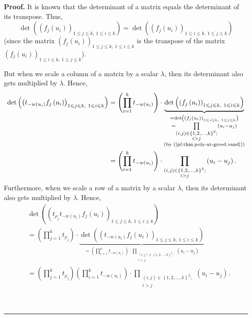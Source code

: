 \documentclass[numbers=enddot,12pt,final,onecolumn,notitlepage]{scrartcl}%
\theoremstyle{definition}
\newenvironment{proof}[1][Proof]{\noindent\textbf{#1.} }{\ \rule{0.5em}{0.5em}}
\let\prodnonlimits\prod
\renewcommand{\prod}{\prodnonlimits\limits}
\renewcommand{\leq}{\leqslant}
\theoremstyle{plainsl}
\begin{document}
\begin{proof}
It is known that the determinant of a matrix equals the determinant of its
transpose. Thus,%
\[
\det\left(  \left(  f_{j}\left(  u_{i}\right)  \right)  _{1\leq j\leq
k,\ 1\leq i\leq k}\right)  =\det\left(  \left(  f_{j}\left(  u_{i}\right)
\right)  _{1\leq i\leq k,\ 1\leq j\leq k}\right)
\]
(since the matrix $\left(  f_{j}\left(  u_{i}\right)  \right)  _{1\leq j\leq
k,\ 1\leq i\leq k}$ is the transpose of the matrix $\left(  f_{j}\left(
u_{i}\right)  \right)  _{1\leq i\leq k,\ 1\leq j\leq k}$).

But when we scale a column of a matrix by a scalar $\lambda$, then its
determinant also gets multiplied by $\lambda$. Hence,%
\begin{align*}
\det\left(  \left(  t_{-w\left(  u_{i}\right)  }f_{j}\left(  u_{i}\right)
\right)  _{1\leq j\leq k,\ 1\leq i\leq k}\right)   &  =\left(  \prod_{i=1}%
^{k}t_{-w\left(  u_{i}\right)  }\right)  \cdot\underbrace{\det\left(  \left(
f_{j}\left(  u_{i}\right)  \right)  _{1\leq j\leq k,\ 1\leq i\leq k}\right)
}_{\substack{=\det\left(  \left(  f_{j}\left(  u_{i}\right)  \right)  _{1\leq
i\leq k,\ 1\leq j\leq k}\right)  \\=\prod_{\substack{\left(  i,j\right)
\in\left\{  1,2,\ldots,k\right\}  ^{2};\\i>j}}\left(  u_{i}-u_{j}\right)
\\\text{(by (\ref{pf.thm.poly-ut-greed.vand}))}}}\\
&  =\left(  \prod_{i=1}^{k}t_{-w\left(  u_{i}\right)  }\right)  \cdot
\prod_{\substack{\left(  i,j\right)  \in\left\{  1,2,\ldots,k\right\}
^{2};\\i>j}}\left(  u_{i}-u_{j}\right)  .
\end{align*}
Furthermore, when we scale a row of a matrix by a scalar $\lambda$, then its
determinant also gets multiplied by $\lambda$. Hence,%
\begin{align*}
&  \det\left(  \left(  t_{\rho_{j}}t_{-w\left(  u_{i}\right)  }f_{j}\left(
u_{i}\right)  \right)  _{1\leq j\leq k,\ 1\leq i\leq k}\right) \\
&  =\left(  \prod_{j=1}^{k}t_{\rho_{j}}\right)  \cdot\underbrace{\det\left(
\left(  t_{-w\left(  u_{i}\right)  }f_{j}\left(  u_{i}\right)  \right)
_{1\leq j\leq k,\ 1\leq i\leq k}\right)  }_{=\left(  \prod_{i=1}%
^{k}t_{-w\left(  u_{i}\right)  }\right)  \cdot\prod_{\substack{\left(
i,j\right)  \in\left\{  1,2,\ldots,k\right\}  ^{2};\\i>j}}\left(  u_{i}%
-u_{j}\right)  }\\
&  =\left(  \prod_{j=1}^{k}t_{\rho_{j}}\right)  \left(  \prod_{i=1}%
^{k}t_{-w\left(  u_{i}\right)  }\right)  \cdot\prod_{\substack{\left(
i,j\right)  \in\left\{  1,2,\ldots,k\right\}  ^{2};\\i>j}}\left(  u_{i}%
-u_{j}\right)  .
\end{align*}



\end{proof}
\end{document}
